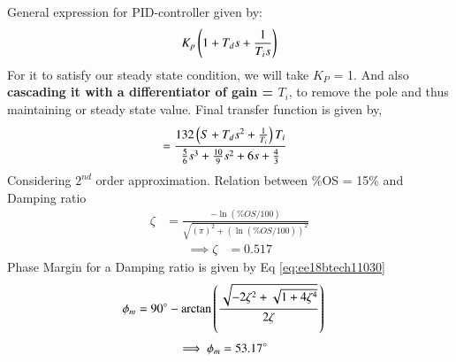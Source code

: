 \begin{enumerate}[label=\thesection.\arabic*.,ref=\thesection.\theenumi]
General expression for PID-controller given by:
\begin{align}
     K_{p}\left(1 + T_{d}s + \frac{1}{T_{i}s}\right)
\end{align}
For it to satisfy our steady state condition, \newline we will take $K_P$ = 1.\newline
And also \textbf{cascading it with a differentiator of gain = $T_i$}, to remove the pole and thus maintaining or steady state value.\newline
Final transfer function is given by,\newline
\begin{align}
    &= \frac{132\left(S + T_{d}s^2 + \frac{1}{T_{i}}\right)T_i}{\frac{5}{6}s^3 + \frac{10}{9}s^2 + 6s + \frac{4}{3}}
\end{align}
Considering $2^{nd}$ order approximation.\newline
Relation between \%OS = 15\% and Damping ratio
\begin{align}
\zeta &= \frac{-\ln(\%OS/100)}{\sqrt{(\pi)^2 + (\ln(\%OS/100))^2}}
\end{align}
\begin{align}
\implies\zeta &= 0.517 
\end{align}
Phase Margin for a Damping ratio is given by Eq \eqref{eq:ee18btech11030}  
\begin{align}
\label{eq:ee18btech11030}
\phi_{m} &= 90\degree - \arctan\left(\frac{\sqrt{-2\zeta^2+\sqrt{1+4\zeta^4}}}{2\zeta}\right)
\end{align}
\begin{align}
\implies \phi_{m} &= 53.17\degree
\end{align}


\end{enumerate}
